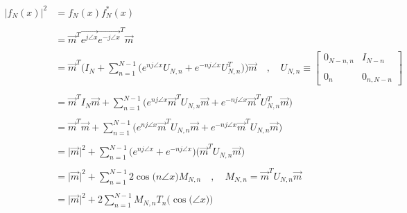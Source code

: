 \documentclass{article}
\begin{document}
\begin{align*}
    \Big|f_{N}(x)\Big|^{2}&= f_{N}(x)f^{*}_{N}(x) \\ \\
                          &= \vec{m}^{T}\vec{e^{j\angle{x}}}\vec{e^{-j\angle{x}}}^{T}\vec{m} \\ \\
                          &= \vec{m}^{T}\Bigg(I_{N} + \sum_{n=1}^{N - 1}\Big(e^{nj\angle{x}}U_{N, n} + e^{-nj\angle{x}}U_{N, n}^{T}\Big)\Bigg)\vec{m} \quad , \quad U_{N, n} \equiv \begin{bmatrix}
                                                                                                                                                                                        0_{N - n, n} & I_{N - n} \\ \\
                                                                                                                                                                                        0_{n} & 0_{n, N - n}
                                                                                                                                                                                      \end{bmatrix} \\ \\
                          &= \vec{m}^{T}I_{N}\vec{m} + \sum_{n=1}^{N - 1}\Bigg(e^{nj\angle{x}}\vec{m}^{T}U_{N, n}\vec{m} + e^{-nj\angle{x}}\vec{m}^{T}U_{N, n}^{T}\vec{m}\Bigg) \\ \\
                          &= \vec{m}^{T}\vec{m} + \sum_{n=1}^{N - 1}\Bigg(e^{nj\angle{x}}\vec{m}^{T}U_{N, n}\vec{m} + e^{-nj\angle{x}}\vec{m}^{T}U_{N, n}\vec{m}\Bigg) \\ \\
                          &= \big|\vec{m}\big|^{2} + \sum_{n=1}^{N - 1}\Big(e^{nj\angle{x}} + e^{-nj\angle{x}}\Big)\Big(\vec{m}^{T}U_{N, n}\vec{m}\Big) \\ \\
                          &= \big|\vec{m}\big|^{2} + \sum_{n=1}^{N - 1}2\cos\big(n\angle{x}\big)M_{N, n} \quad , \quad M_{N, n} = \vec{m}^{T}U_{N, n}\vec{m} \\ \\
                          &= \big|\vec{m}\big|^{2} + 2\sum_{n=1}^{N - 1}M_{N, n}T_{n}\Big(\cos\big(\angle{x}\big)\Big)
\end{align*}
\end{document}
